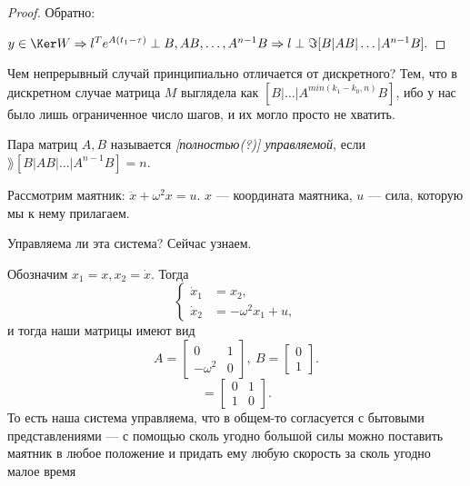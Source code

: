 {\begin{proof}
	Обратно: %
	
	$ y \in \Ker W \Rightarrow l^Te^{A(t_1-\tau)} \perp B, AB,\dots,A^{n-1}B \Rightarrow l\perp \Im [B|AB|\dots|A^{n-1}B]. $
\end{proof}

Чем непрерывный случай принципиально отличается от дискретного? Тем, что в дискретном случае матрица $M$ выглядела как $[B|\dots|A^{min(k_1-k_0,n)}B]$, ибо у нас было лишь ограниченное число шагов, и их могло просто не хватить.

\begin{df}
Пара матриц $A,B$ называется \emph{[полностью(?)] управляемой}, если $\rang[B|AB|\dots|A^{n-1}B]=n$.
\end{df}

\begin{ex}%
	Рассмотрим маятник: $\ddot{x} + \omega^2 x = u$. $x$ --- координата маятника, $u$ --- сила, которую мы к нему прилагаем.
	
	Управляема ли эта система? Сейчас узнаем.
	
	Обозначим $x_1=x, x_2 = \dot{x}$. Тогда
	\begin{equation} \label{PendulumSystem}
		\left\{
		\begin{aligned}
			\dot{x}_1 &=x_2, \\
			\dot{x}_2 &=-\omega^2 x_1 +u,
		\end{aligned}
		\right.
	\end{equation}
	и тогда наши матрицы имеют вид
	\begin{equation*}
		A=\begin{bmatrix}
			0 & 1 \\ -\omega^2 & 0
		\end{bmatrix}, \ 
		B=\begin{bmatrix}
			0\\1
		\end{bmatrix}.
	\end{equation*}
	\begin{equation*}
		[B|AB] = \begin{bmatrix} 0&1\\1&0 \end{bmatrix}.
	\end{equation*}
	То есть наша система управляема, что в общем-то согласуется с бытовыми представлениями --- с помощью сколь угодно большой силы можно поставить маятник в любое положение и придать ему любую скорость за сколь угодно малое время


\end{ex}}
